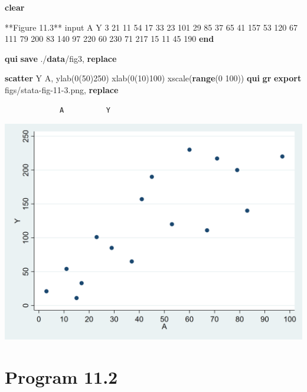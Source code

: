 \documentclass[
  10pt,
]{book}
\newenvironment{Shaded}{\begin{snugshade}}{\end{snugshade}}
\newcommand{\BaseNTok}[1]{\textcolor[rgb]{0.00,0.00,0.81}{#1}}
\newcommand{\KeywordTok}[1]{\textcolor[rgb]{0.13,0.29,0.53}{\textbf{#1}}}
\newcommand{\NormalTok}[1]{#1}
\begin{document}
\begin{Shaded}
\begin{Highlighting}[]
\KeywordTok{clear}

\NormalTok{**Figure 11.3**}
\NormalTok{input A Y}
\NormalTok{3   21  }
\NormalTok{11  54}
\NormalTok{17  33}
\NormalTok{23  101}
\NormalTok{29  85}
\NormalTok{37  65}
\NormalTok{41  157}
\NormalTok{53  120}
\NormalTok{67  111}
\NormalTok{79  200}
\NormalTok{83  140}
\NormalTok{97  220}
\NormalTok{60  230}
\NormalTok{71  217}
\NormalTok{15  11}
\NormalTok{45  190}
\KeywordTok{end}

\KeywordTok{qui} \KeywordTok{save}\NormalTok{ ./}\KeywordTok{data}\NormalTok{/fig3, }\KeywordTok{replace}

\KeywordTok{scatter}\NormalTok{ Y A, ylab(0(50)250) xlab(0(10)100) }\BaseNTok{xscale}\NormalTok{(}\KeywordTok{range}\NormalTok{(0 100))}
\KeywordTok{qui} \KeywordTok{gr} \KeywordTok{export}\NormalTok{ figs/stata{-}fig{-}11{-}3.png, }\KeywordTok{replace}
\end{Highlighting}
\end{Shaded}

\begin{verbatim}
             A          Y
\end{verbatim}

\begin{center}\includegraphics[width=0.85\linewidth]{figs/stata-fig-11-3} \end{center}

\hypertarget{program-11.2-1}{%
\section{Program 11.2}\label{program-11.2-1}}
\end{document}
